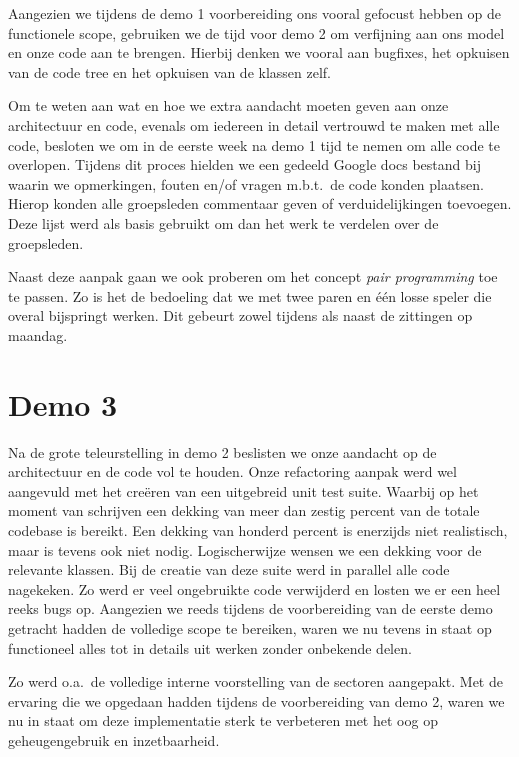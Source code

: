 \documentclass[12pt,a4paper]{report}
\begin{document}
Aangezien we tijdens de demo 1 voorbereiding ons vooral gefocust hebben op de functionele scope, gebruiken we de tijd voor demo 2 om verfijning aan ons model en onze code aan te brengen. Hierbij denken we vooral aan bugfixes, het opkuisen van de code tree en het opkuisen van de klassen zelf.

Om te weten aan wat en hoe we extra aandacht moeten geven aan onze architectuur en code, evenals om iedereen in detail vertrouwd te maken met alle code, besloten we om in de eerste week na demo 1 tijd te nemen om alle code te overlopen. Tijdens dit proces hielden we een gedeeld Google docs bestand bij waarin we opmerkingen, fouten en/of vragen m.b.t.\ de code konden plaatsen. Hierop konden alle groepsleden commentaar geven of verduidelijkingen toevoegen. Deze lijst werd als basis gebruikt om dan het werk te verdelen over de groepsleden.

Naast deze aanpak gaan we ook proberen om het concept \emph{pair programming} toe te passen. Zo is het de bedoeling dat we met twee paren en \'e\'en losse speler die overal bijspringt werken. Dit gebeurt zowel tijdens als naast de zittingen op maandag.

\section{Demo 3}

Na de grote teleurstelling in demo 2 beslisten we onze aandacht op de architectuur en de code vol te houden. Onze refactoring aanpak werd wel aangevuld met het cre\"eren van een uitgebreid unit test suite. Waarbij op het moment van schrijven een dekking van meer dan zestig percent van de totale codebase is bereikt. Een dekking van honderd percent is enerzijds niet realistisch, maar is tevens ook niet nodig. Logischerwijze wensen we een dekking voor de relevante klassen. Bij de creatie van deze suite werd in parallel alle code nagekeken. Zo werd er veel ongebruikte code verwijderd en losten we er een heel reeks bugs op. Aangezien we reeds tijdens de voorbereiding van de eerste demo getracht hadden de volledige scope te bereiken, waren we nu tevens in staat op functioneel alles tot in details uit werken zonder onbekende delen.

Zo werd o.a.\ de volledige interne voorstelling van de sectoren aangepakt. Met de ervaring die we opgedaan hadden tijdens de voorbereiding van demo 2, waren we nu in staat om deze implementatie sterk te verbeteren met het oog op geheugengebruik en inzetbaarheid.
\end{document}
